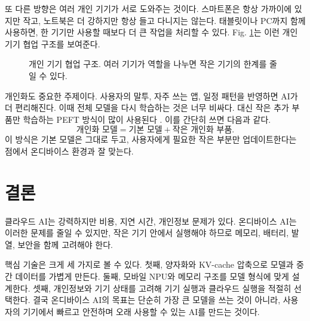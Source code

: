 \documentclass[twocolumn,10pt]{article}
\begin{document}
또 다른 방향은 여러 개인 기기가 서로 도와주는 것이다. 스마트폰은 항상 가까이에 있지만 작고, 노트북은 더 강하지만 항상 들고 다니지는 않는다. 태블릿이나 PC까지 함께 사용하면, 한 기기만 사용할 때보다 더 큰 작업을 처리할 수 있다. Fig. \ref{fig:ko_personal_cloud}는 이런 개인 기기 협업 구조를 보여준다.

\begin{figure}[t]
\centering
{}
\caption{개인 기기 협업 구조. 여러 기기가 역할을 나누면 작은 기기의 한계를 줄일 수 있다.}
\label{fig:ko_personal_cloud}
\end{figure}

개인화도 중요한 주제이다. 사용자의 말투, 자주 쓰는 앱, 일정 패턴을 반영하면 AI가 더 편리해진다. 이때 전체 모델을 다시 학습하는 것은 너무 비싸다. 대신 작은 추가 부품만 학습하는 PEFT 방식이 많이 사용된다 \cite{dora2024,minions2025}. 이를 간단히 쓰면 다음과 같다.
\begin{equation}
\text{개인화 모델} = \text{기본 모델} + \text{작은 개인화 부품}.
\label{eq:ko_peft_simple}
\end{equation}
이 방식은 기본 모델은 그대로 두고, 사용자에게 필요한 작은 부분만 업데이트한다는 점에서 온디바이스 환경과 잘 맞는다.

\section{결론}
클라우드 AI는 강력하지만 비용, 지연 시간, 개인정보 문제가 있다. 온디바이스 AI는 이러한 문제를 줄일 수 있지만, 작은 기기 안에서 실행해야 하므로 메모리, 배터리, 발열, 보안을 함께 고려해야 한다.

핵심 기술은 크게 세 가지로 볼 수 있다. 첫째, 양자화와 KV-cache 압축으로 모델과 중간 데이터를 가볍게 만든다. 둘째, 모바일 NPU와 메모리 구조를 모델 형식에 맞게 설계한다. 셋째, 개인정보와 기기 상태를 고려해 기기 실행과 클라우드 실행을 적절히 선택한다. 결국 온디바이스 AI의 목표는 단순히 가장 큰 모델을 쓰는 것이 아니라, 사용자의 기기에서 빠르고 안전하며 오래 사용할 수 있는 AI를 만드는 것이다.



\end{document}
